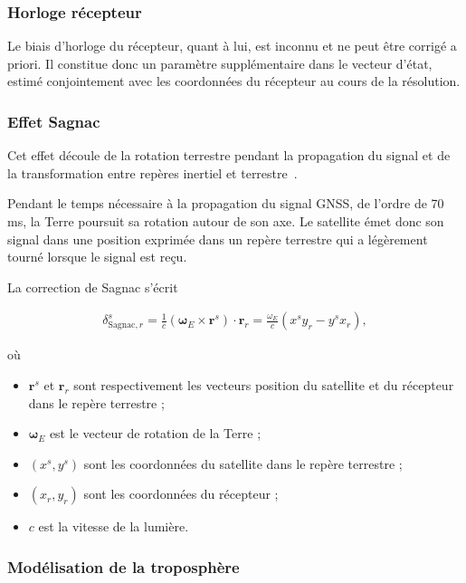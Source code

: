 \subsubsection{Horloge récepteur}

Le biais d'horloge du récepteur, quant à lui, est inconnu et ne peut être corrigé a priori. Il constitue donc un paramètre supplémentaire dans le vecteur d'état, estimé conjointement avec les coordonnées du récepteur au cours de la résolution.

\subsubsection{Effet Sagnac}\label{sagnac}

Cet effet découle de la rotation terrestre pendant la propagation du signal et
de la transformation entre repères inertiel et terrestre~\cite{ashby2003}.

Pendant le temps nécessaire à la propagation du signal GNSS, de l'ordre de 70 ms, la Terre poursuit sa rotation autour de son axe. Le satellite émet donc son signal dans une position exprimée dans un repère terrestre qui a légèrement tourné lorsque le signal est reçu. 

La correction de Sagnac s'écrit

\begin{align}
\delta_{\mathrm{Sagnac},r}^s
=
\frac{1}{c} (\boldsymbol\omega_E \times \mathbf r^s)\cdot\mathbf r_r
=
\frac{\omega_E}{c}
\left(
x^s y_r
-
y^s x_r
\right),
\end{align}

où

\begin{itemize}
    \item $\mathbf r^s$ et $\mathbf r_r$ sont respectivement les vecteurs position du satellite et du récepteur dans le repère terrestre ;
    \item $\boldsymbol\omega_E$ est le vecteur de rotation de la Terre ;
    \item $(x^s,y^s)$ sont les coordonnées du satellite dans le repère terrestre ;
    \item $(x_r,y_r)$ sont les coordonnées du récepteur ;
    \item $c$ est la vitesse de la lumière.
\end{itemize}

\subsubsection{Modélisation de la troposphère}

